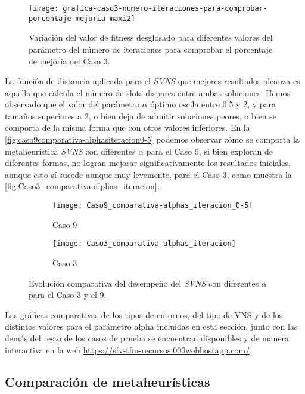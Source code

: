 \begin{figure}
	\centering
	\texttt{[image: grafica-caso3-numero-iteraciones-para-comprobar-porcentaje-mejoria-maxi2]}
	\caption{Variación del valor de fitness desglosado para diferentes valores del parámetro del número de iteraciones para comprobar el porcentaje de mejoría del Caso 3.}
	\label{fig:5:caso3-numero-iteraciones-para-comprobar-porcentaje-mejoria}
\end{figure}




La función de distancia aplicada para el \textit{SVNS} que mejores resultados alcanza es aquella que calcula el número de slots dispares entre ambas soluciones. Hemos observado que el valor del parámetro $\alpha$ óptimo oscila entre 0.5 y 2, y para tamaños superiores a 2, o bien deja de admitir soluciones peores, o bien se comporta de la misma forma que con otros valores inferiores. En la \autoref{fig:caso9comparativa-alphasiteracion0-5} podemos observar cómo se comporta la metaheurística \textit{SVNS} con diferentes $\alpha$ para el Caso 9, si bien exploran de diferentes formas, no logran mejorar significativamente los resultados iniciales, aunque esto sí sucede aunque muy levemente, para el Caso 3, como muestra la \autoref{fig:Caso3_comparativa-alphas_iteracion}.

\begin{figure}
	\begin{subfigure}{\linewidth}
	\texttt{[image: Caso9\_comparativa-alphas\_iteracion\_0-5]}
	\caption{Caso 9}
	\label{fig:caso9comparativa-alphasiteracion0-5}
	\centering
	\end{subfigure}

	\begin{subfigure}{\linewidth}
	\texttt{[image: Caso3\_comparativa-alphas\_iteracion]}
	\caption{Caso 3}
	\label{fig:Caso3_comparativa-alphas_iteracion}
	\centering
\end{subfigure}
	\caption{Evolución comparativa del desempeño del \textit{SVNS} con diferentes \textbf{$\alpha$} para el Caso 3 y el 9.}
\end{figure}

Las gráficas comparativas de los tipos de entornos, del tipo de VNS y de los distintos valores para el parámetro alpha incluidas en esta sección, junto con las demás del resto de los casos de prueba se encuentran disponibles y de manera interactiva en la web \url{https://sfv-tfm-recursos.000webhostapp.com/}.

\subsection{Comparación de metaheurísticas}
\label{sec:5:comparacion-metaheuristicas}

